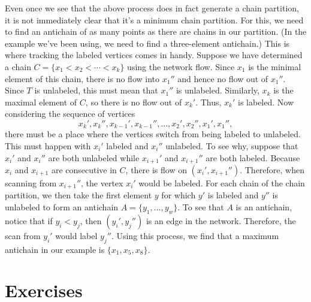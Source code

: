 Even once we see that the above process does in fact generate a chain
partition, it is not immediately clear that it's a minimum chain
partition. For this, we need to find an antichain of as many points as
there are chains in our partition. (In the example we've been using,
we need to find a three-element antichain.) This is where tracking
the labeled vertices comes in handy. Suppose we have determined a
chain $C=\{x_1<x_2<\cdots < x_k\}$ using the network flow. Since $x_1$
is the minimal element of this chain, there is no flow into $x_1''$
and hence no flow out of $x_1''$. Since $T$ is unlabeled, this must
mean that $x_1''$ is unlabeled. Similarly, $x_k$ is the maximal
element of $C$, so there is no flow out of $x_k'$. Thus, $x_k'$ is
labeled. Now considering the sequence of vertices
\[x_k',x_k'',x_{k-1}',x_{k-1}'',\dots,x_2',x_2'',x_1',x_1'',\] there
must be a place where the vertices switch from being labeled to
unlabeled. This must happen with $x_i'$ labeled and $x_i''$
unlabeled. To see why, suppose that $x_i'$ and $x_i''$ are both
unlabeled while $x_{i+1}'$ and $x_{i+1}''$ are both labeled. Because
$x_i$ and $x_{i+1}$ are consecutive in $C$, there is flow on
$(x_i',x_{i+1}'')$. Therefore, when scanning from $x_{i+1}''$, the
vertex $x_i'$ would be labeled. For each chain of the chain partition,
we then take the first element $y$ for which $y'$ is labeled and $y''$
is unlabeled to form an antichain $A=\{y_1,\dots,y_w\}$. To see that
$A$ is an antichain, notice that if $y_i<y_j$, then $(y_i',y_j'')$ is
an edge in the network. Therefore, the scan from $y_i'$ would label
$y_j''$. Using this process, we find that a maximum antichain in our
example is $\{x_1,x_5,x_8\}$.

\section{Exercises}

